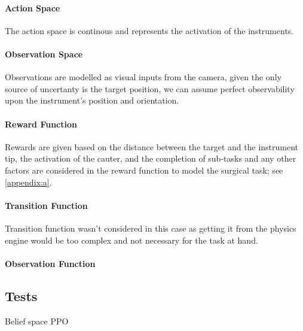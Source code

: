 \paragraph{Action Space}
The action space is continous and represents the activation of the instruments. 
\paragraph{Observation Space}
Observations are modelled as visual inputs from the camera, given the only source of 
uncertanty is the target position, we can assume perfect observability upon the 
instrument's position and orientation.

\paragraph{Reward Function}
Rewards are given based on the distance between the target and the instrument tip,
the activation of the cauter, and the completion of sub-tasks and any other factors 
are considered in the reward function to model the surgical task; see \ref{appendix:a}.

\paragraph{Transition Function}
Transition function wasn't considered in this case as getting it from the physics 
engine would be too complex and not necessary for the task at hand.

\paragraph{Observation Function}

\subsection{Tests}
Belief space PPO 

